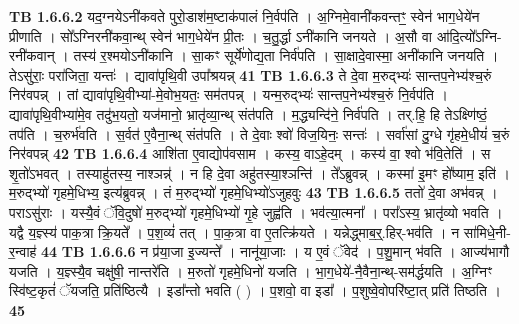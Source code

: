 \documentclass[17pt]{extarticle}
\begin{document}
                                \textbf{ TB 1.6.6.2} \newline
                  यद॒ग्नयेऽनी॑कवते पुरो॒डाश॑म॒ष्टाक॑पालं नि॒र्वप॑ति । अ॒ग्निमे॒वानी॑कवन्तꣳ॒॒ स्वेन॑ भाग॒धेये॑न प्रीणाति । सो᳚ऽग्निरनी॑कवा॒न्थ् स्वेन॑ भाग॒धेये॑न प्री॒तः । च॒तु॒र्द्धा ऽनी॑कानि जनयते । अ॒सौ वा आ॑दि॒त्यो᳚ऽग्नि-रनी॑कवान् । तस्य॑ र॒श्मयोऽनी॑कानि । सा॒कꣳ सूर्ये॑णोद्य॒ता निर्व॑पति । सा॒क्षादे॒वास्मा॒ अनी॑कानि जनयति । तेऽसु॑राः॒ परा॑जिता॒ यन्तः॑ । द्यावा॑पृथि॒वी उपा᳚श्रयन्न् \textbf{ 41} \newline
                  \newline
                                \textbf{ TB 1.6.6.3} \newline
                  ते दे॒वा म॒रुद्भ्यः॑ सान्तप॒नेभ्य॑श्च॒रुं निर॑वपन्न् । तां द्यावा॑पृथि॒वीभ्या॑-मे॒वोभ॒यतः॒ सम॑तपन्न् । यन्म॒रुद्भ्यः॑ सान्तप॒नेभ्य॑श्च॒रुं नि॒र्वप॑ति । द्यावा॑पृथि॒वीभ्या॑मे॒व तदु॑भ॒यतो॒ यज॑मानो॒ भ्रातृ॑व्या॒न्थ् संत॑पति । म॒द्ध्यन्दि॑ने॒ निर्व॑पति । तर्.हि॒ हि तेऽक्ष्णि॑ष्ठं॒ तप॑ति । च॒रुर्भ॑वति । स॒र्वत॑ ए॒वैना॒न्थ् संत॑पति । ते दे॒वाः श्वो॑ विज॒यिनः॒ सन्तः॑ । सर्वा॑सां दु॒ग्धे गृ॑हमे॒धीयं॑ च॒रुं निर॑वपन्न् \textbf{ 42} \newline
                  \newline
                                \textbf{ TB 1.6.6.4} \newline
                  आशि॑ता ए॒वाद्योप॑वसाम । कस्य॒ वाऽहे॒दम् । कस्य॑ वा॒ श्वो भ॑वि॒तेति॑ । स शृ॒तो॑ऽभवत् । तस्याहु॑तस्य॒ नाश्ञन्न्॑ । न हि दे॒वा अहु॑तस्या॒श्ञन्ति॑ । ते᳚ऽब्रुवन्न् । कस्मा॑ इ॒मꣳ हो᳚ष्याम॒ इति॑ । म॒रुद्भ्यो॑ गृहमे॒धिभ्य॒ इत्य॑ब्रुवन्न् । तं म॒रुद्भ्यो॑ गृहमे॒धिभ्यो॑ऽजुहवुः \textbf{ 43} \newline
                  \newline
                                \textbf{ TB 1.6.6.5} \newline
                  ततो॑ दे॒वा अभ॑वन्न् । पराऽसु॑राः । यस्यै॒वं ॅवि॒दुषो॑ म॒रुद्भ्यो॑ गृहमे॒धिभ्यो॑ गृ॒हे जुह्व॑ति । भव॑त्या॒त्मना᳚ । परा᳚ऽस्य॒ भ्रातृ॑व्यो भवति । यद्वै य॒ज्ञ्स्य॑ पाक॒त्रा क्रि॒यते᳚ । प॒श॒व्यं॑ तत् । पा॒क॒त्रा वा ए॒तत्क्रि॑यते । यन्नेद्ध्माब॒र्॒.हिर्-भव॑ति । न सा॑मिधे॒नी-र॒न्वाह॑ \textbf{ 44} \newline
                  \newline
                                \textbf{ TB 1.6.6.6} \newline
                  न प्र॑या॒जा इ॒ज्यन्ते᳚ । नानू॑या॒जाः । य ए॒वं ॅवेद॑ । प॒शु॒मान् भ॑वति । आज्य॑भागौ यजति । य॒ज्ञ्स्यै॒व चक्षु॑षी॒ नान्तरे॑ति । म॒रुतो॑ गृहमे॒धिनो॑ यजति । भा॒ग॒धेये॑-नै॒वैना॒न्थ्-सम॑र्द्धयति । अ॒ग्निꣳ स्वि॑ष्ट॒कृतं॑ ॅयजति॒ प्रति॑ष्ठित्यै । इडा᳚न्तो भवति ( ) । प॒शवो॒ वा इडा᳚ । प॒शुष्वे॒वोपरि॑ष्टा॒त् प्रति॑ तिष्ठति । \textbf{ 45} \newline
\end{document}
